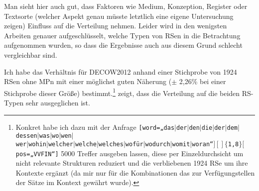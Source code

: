 \begin{table}
	\caption{\label{tab:791}Verteilung rRSe und aRSe in verschiedenen Datentypen}
\end{table}
Man sieht hier auch gut, dass Faktoren wie Medium, Konzeption, Register oder Textsorte (welcher Aspekt genau müsste letztlich eine eigene Untersuchung zeigen) Einfluss auf die Verteilung nehmen. Leider wird in den wenigsten Arbeiten genauer aufgeschlüsselt, welche Typen von RSen in die Betrachtung aufgenommen wurden, so dass die Ergebnisse auch aus diesem Grund schlecht vergleichbar sind.

Ich habe das Verhältnis für DECOW2012 anhand einer Stichprobe von 1924 RSen ohne MPn mit einer möglichst guten Näherung ($\pm$ 2,26\% bei einer Stichprobe dieser Größe) bestimmt.\footnote{Konkret habe ich dazu mit der Anfrage \texttt{[word=„das$\vert$der$\vert$den$\vert$die$\vert$der$\vert$dem$\vert$dessen$\vert$was$\vert$wo$\vert$wen$\vert$\\wer$\vert$wohin$\vert$welcher$\vert$welche$\vert$welches$\vert$wofür$\vert$wodurch$\vert$womit$\vert$woran“$][]\lbrace$1,8$\rbrace[$pos=„VVFIN“]} 5000 Treffer ausgeben lassen, diese per Einzeldurchsicht um nicht relevante Strukturen reduziert und die verbliebenen 1924 RSe um ihre Kontexte ergänzt (da mir nur für die Kombinationen das zur Verfügungstellen der Sätze im Kontext gewährt wurde).}  zeigt, dass die Verteilung auf die beiden RS-Typen sehr ausgeglichen ist.


